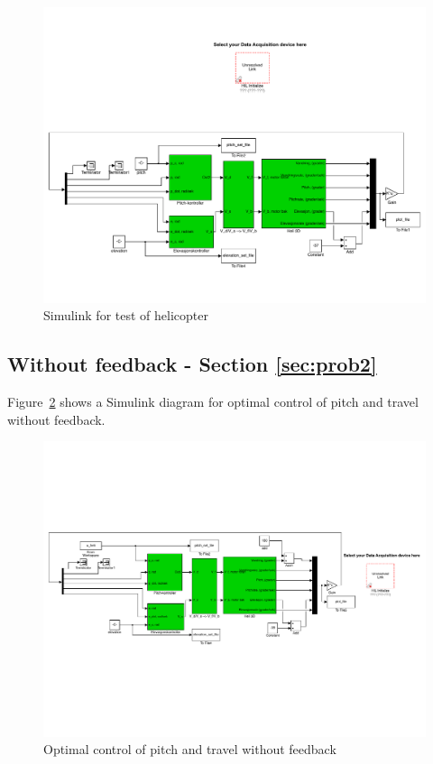 \documentclass[11pt,a4paper,USenglish]{article} %
\begin{document}
\begin{figure}[!h]
\centerline{\includegraphics[width=1\textwidth]{helikoptertest}}
\caption{Simulink for test of helicopter}
\label{fig:testrunSim}
\end{figure}

\newpage
\subsection{Without feedback - Section \ref{sec:prob2}}\label{sec:simulink:2}
Figure~\ref{fig:without} shows a Simulink diagram for optimal control of pitch and travel without feedback.


\begin{figure}[!h]
\centerline{\includegraphics[width=1\textwidth]{helikopter10_2_without_feed}}
\caption{Optimal control of pitch and travel without feedback}
\label{fig:without}
\end{figure}
\end{document}
